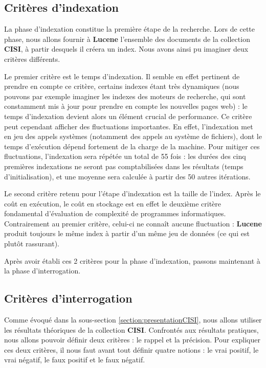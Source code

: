 \subsection{Critères d'indexation}

La phase d’indexation constitue la première étape de la recherche. Lors de cette phase, nous allons fournir à \textbf{Lucene} l’ensemble des documents de la collection \textbf{CISI}, à partir desquels il créera un index. Nous avons ainsi pu imaginer deux critères différents.

Le premier critère est le temps d’indexation. Il semble en effet pertinent de prendre en compte ce critère, certains indexes étant très dynamiques (nous pouvons par exemple imaginer les indexes des moteurs de recherche, qui sont constamment mis à jour pour prendre en compte les nouvelles pages web) : le temps d’indexation devient alors un élément crucial de performance. Ce critère peut cependant afficher des fluctuations importantes. En effet, l’indexation met en jeu des appels systèmes (notamment des appels au système de fichiers), dont le temps d’exécution dépend fortement de la charge de la machine. Pour mitiger ces fluctuations, l’indexation sera répétée un total de 55 fois : les durées des cinq premières indexations ne seront pas comptabilisées dans les résultats (temps d'initialisation), et une moyenne sera calculée à partir des 50 autres itérations.

Le second critère retenu pour l’étape d’indexation est la taille de l’index. Après le coût en exécution, le coût en stockage est en effet le deuxième critère fondamental d’évaluation de complexité de programmes informatiques. Contrairement au premier critère, celui-ci ne connaît aucune fluctuation : \textbf{Lucene} produit toujours le même index à partir d’un même jeu de données (ce qui est plutôt rassurant). 

Après avoir établi ces 2 critères pour la phase d’indexation, passons maintenant à la phase d’interrogation.

\subsection{Critères d’interrogation}

Comme évoqué dans la sous-section \ref{section:presentationCISI}, nous allons utiliser les résultats théoriques de la collection \textbf{CISI}. Confrontés aux résultats pratiques, nous allons pouvoir définir deux critères : le rappel et la précision. Pour expliquer ces deux critères, il nous faut avant tout définir quatre notions : le vrai positif, le vrai négatif, le faux positif et le faux négatif.

